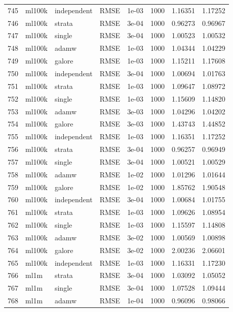 \begin{longtable}{rlllrrrr}
745 & ml100k & independent & RMSE & 1e-03 & 1000 & 1.16351 & 1.17252 \\
\rowcolor{oursbg}
746 & ml100k & strata & RMSE & 3e-04 & 1000 & 0.96273 & 0.96967 \\
747 & ml100k & single & RMSE & 3e-04 & 1000 & 1.00523 & 1.00532 \\
748 & ml100k & adamw & RMSE & 1e-03 & 1000 & 1.04344 & 1.04229 \\
749 & ml100k & galore & RMSE & 1e-03 & 1000 & 1.15211 & 1.17608 \\
750 & ml100k & independent & RMSE & 3e-04 & 1000 & 1.00694 & 1.01763 \\
\rowcolor{oursbg}
751 & ml100k & strata & RMSE & 1e-03 & 1000 & 1.09647 & 1.08972 \\
752 & ml100k & single & RMSE & 1e-03 & 1000 & 1.15609 & 1.14820 \\
753 & ml100k & adamw & RMSE & 3e-03 & 1000 & 1.04296 & 1.04202 \\
754 & ml100k & galore & RMSE & 3e-03 & 1000 & 1.43743 & 1.44852 \\
755 & ml100k & independent & RMSE & 1e-03 & 1000 & 1.16351 & 1.17252 \\
\rowcolor{oursbg}
756 & ml100k & strata & RMSE & 3e-04 & 1000 & 0.96257 & 0.96949 \\
757 & ml100k & single & RMSE & 3e-04 & 1000 & 1.00521 & 1.00529 \\
758 & ml100k & adamw & RMSE & 1e-02 & 1000 & 1.01296 & 1.01644 \\
759 & ml100k & galore & RMSE & 1e-02 & 1000 & 1.85762 & 1.90548 \\
760 & ml100k & independent & RMSE & 3e-04 & 1000 & 1.00684 & 1.01755 \\
\rowcolor{oursbg}
761 & ml100k & strata & RMSE & 1e-03 & 1000 & 1.09626 & 1.08954 \\
762 & ml100k & single & RMSE & 1e-03 & 1000 & 1.15597 & 1.14808 \\
763 & ml100k & adamw & RMSE & 3e-02 & 1000 & 1.00569 & 1.00898 \\
764 & ml100k & galore & RMSE & 3e-02 & 1000 & 2.00236 & 2.06601 \\
765 & ml100k & independent & RMSE & 1e-03 & 1000 & 1.16331 & 1.17230 \\
\rowcolor{oursbg}
766 & ml1m & strata & RMSE & 3e-04 & 1000 & 1.03092 & 1.05052 \\
767 & ml1m & single & RMSE & 3e-04 & 1000 & 1.07528 & 1.09444 \\
768 & ml1m & adamw & RMSE & 1e-04 & 1000 & 0.96096 & 0.98066 \\

\end{longtable}
